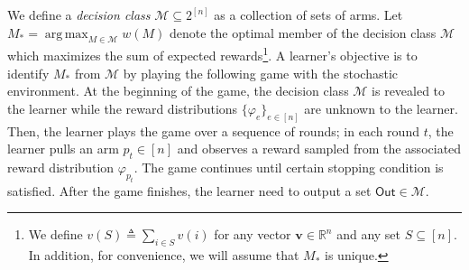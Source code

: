 \documentclass{article}
\newcommand{\Rew}{\varphi}
\newcommand{\E}{\mathbb E}
\newcommand{\M}{\mathcal M}
\newcommand{\RR}{\mathbb R}
\DeclareMathOperator*{\argmax}{arg\,max}
\newcommand{\out}{\mathsf{Out}}
\renewcommand{\vec}[1]{\boldsymbol{#1}}
\begin{document}
We define a \emph{decision class} $\M \subseteq 2^{[n]}$ as a  collection of sets of arms.
Let $M_*=\argmax_{M\in \M} w(M)$ denote the optimal member of the decision class $\M$ which maximizes the sum of expected rewards\footnote{We define $v(S)\triangleq \sum_{i\in S} v(i)$ for any vector $\vec v\in\RR^{n}$ and any set $S \subseteq[n]$. In addition, for convenience, we will assume that $M_*$ is unique.}.
A learner's objective is to identify $M_*$ from $\M$ by playing the following game with the stochastic environment.
At the beginning of the game, the decision class $\M$ is revealed to the learner while the reward distributions $\{\Rew_e\}_{e\in[n]}$ are unknown to the learner.
Then, the learner plays the game over a sequence of rounds;
in each round $t$, the learner pulls an arm $p_t\in [n]$ and observes a reward sampled from the associated reward distribution $\Rew_{p_t}$.
The game continues until certain stopping condition is satisfied.
After the game finishes, the learner need to output a set $\out \in \M$.



\end{document}
